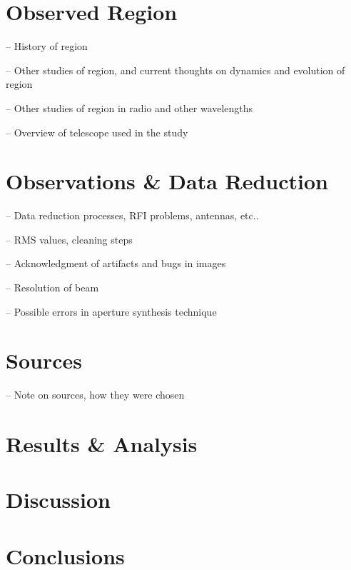 \documentclass[iop]{aastex}
\begin{document}
\section{Observed Region}
-- History of region

-- Other studies of region, and current thoughts on dynamics and evolution of region

-- Other studies of region in radio and other wavelengths

-- Overview of telescope used in the study

\section{Observations \& Data Reduction}
-- Data reduction processes, RFI problems, antennas, etc..

-- RMS values, cleaning steps

-- Acknowledgment of artifacts and bugs in images

-- Resolution of beam

-- Possible errors in aperture synthesis technique


\section{Sources}
-- Note on sources, how they were chosen

\section{Results \& Analysis}



\section{Discussion}




\section{Conclusions}



		
{}

\end{document}
